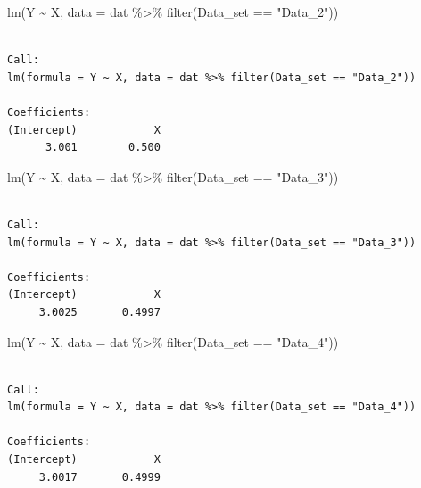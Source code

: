 \documentclass[
  letterpaper,
  DIV=11,
  numbers=noendperiod]{scrreprt}
\newenvironment{Shaded}{\begin{snugshade}}{\end{snugshade}}
\newcommand{\AttributeTok}[1]{\textcolor[rgb]{0.40,0.45,0.13}{#1}}
\newcommand{\FunctionTok}[1]{\textcolor[rgb]{0.28,0.35,0.67}{#1}}
\newcommand{\NormalTok}[1]{\textcolor[rgb]{0.00,0.23,0.31}{#1}}
\newcommand{\SpecialCharTok}[1]{\textcolor[rgb]{0.37,0.37,0.37}{#1}}
\newcommand{\StringTok}[1]{\textcolor[rgb]{0.13,0.47,0.30}{#1}}
\begin{document}
\begin{Shaded}
\begin{Highlighting}[]
\FunctionTok{lm}\NormalTok{(Y }\SpecialCharTok{\textasciitilde{}}\NormalTok{ X, }\AttributeTok{data =}\NormalTok{ dat }\SpecialCharTok{\%\textgreater{}\%} \FunctionTok{filter}\NormalTok{(Data\_set }\SpecialCharTok{==} \StringTok{"Data\_2"}\NormalTok{))}
\end{Highlighting}
\end{Shaded}

\begin{verbatim}

Call:
lm(formula = Y ~ X, data = dat %>% filter(Data_set == "Data_2"))

Coefficients:
(Intercept)            X  
      3.001        0.500  
\end{verbatim}

\begin{Shaded}
\begin{Highlighting}[]
\FunctionTok{lm}\NormalTok{(Y }\SpecialCharTok{\textasciitilde{}}\NormalTok{ X, }\AttributeTok{data =}\NormalTok{ dat }\SpecialCharTok{\%\textgreater{}\%} \FunctionTok{filter}\NormalTok{(Data\_set }\SpecialCharTok{==} \StringTok{"Data\_3"}\NormalTok{))}
\end{Highlighting}
\end{Shaded}

\begin{verbatim}

Call:
lm(formula = Y ~ X, data = dat %>% filter(Data_set == "Data_3"))

Coefficients:
(Intercept)            X  
     3.0025       0.4997  
\end{verbatim}

\begin{Shaded}
\begin{Highlighting}[]
\FunctionTok{lm}\NormalTok{(Y }\SpecialCharTok{\textasciitilde{}}\NormalTok{ X, }\AttributeTok{data =}\NormalTok{ dat }\SpecialCharTok{\%\textgreater{}\%} \FunctionTok{filter}\NormalTok{(Data\_set }\SpecialCharTok{==} \StringTok{"Data\_4"}\NormalTok{))}
\end{Highlighting}
\end{Shaded}

\begin{verbatim}

Call:
lm(formula = Y ~ X, data = dat %>% filter(Data_set == "Data_4"))

Coefficients:
(Intercept)            X  
     3.0017       0.4999  
\end{verbatim}
\end{document}
